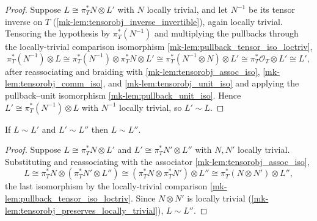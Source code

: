 \begin{proof}
  \leanok
  Suppose \(L \cong \pi_T^* N \otimes L'\) with \(N\) locally trivial, and let
  \(N^{-1}\) be its tensor inverse on \(T\)
  (\ref{mk-lem:tensorobj_inverse_invertible}), again locally trivial. Tensoring
  the hypothesis by \(\pi_T^*(N^{-1})\) and multiplying the pullbacks through
  the locally-trivial comparison isomorphism
  \ref{mk-lem:pullback_tensor_iso_loctriv},
  \[
    \pi_T^*(N^{-1}) \otimes L
      \cong \pi_T^*(N^{-1}) \otimes \pi_T^* N \otimes L'
      \cong \pi_T^*(N^{-1} \otimes N) \otimes L'
      \cong \pi_T^* \mathcal{O}_T \otimes L'
      \cong L' ,
  \]
  after reassociating and braiding with
  \ref{mk-lem:tensorobj_assoc_iso}, \ref{mk-lem:tensorobj_comm_iso}, and
  \ref{mk-lem:tensorobj_unit_iso}
  and applying the pullback--unit isomorphism \ref{mk-lem:pullback_unit_iso}.
  Hence \(L' \cong \pi_T^*(N^{-1}) \otimes L\) with \(N^{-1}\) locally trivial,
  so \(L' \sim L\).
\end{proof}

\begin{lemma}\label{mk-lem:relpic_setoid_trans}
  \leanok

  If \(L \sim L'\) and \(L' \sim L''\) then \(L \sim L''\).
\end{lemma}

\begin{proof}
  \leanok
  Suppose \(L \cong \pi_T^* N \otimes L'\) and \(L' \cong \pi_T^* N' \otimes L''\)
  with \(N, N'\) locally trivial. Substituting and reassociating with the
  associator \ref{mk-lem:tensorobj_assoc_iso},
  \[
    L \cong \pi_T^* N \otimes (\pi_T^* N' \otimes L'')
      \cong (\pi_T^* N \otimes \pi_T^* N') \otimes L''
      \cong \pi_T^*(N \otimes N') \otimes L'' ,
  \]
  the last isomorphism by the locally-trivial comparison
  \ref{mk-lem:pullback_tensor_iso_loctriv}. Since \(N \otimes N'\) is locally
  trivial (\ref{mk-lem:tensorobj_preserves_locally_trivial}), \(L \sim L''\).
\end{proof}

